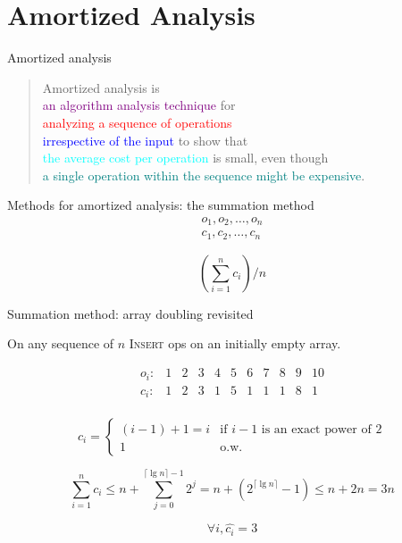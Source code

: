 \section{Amortized Analysis}

\begin{frame}{Amortized analysis}
  \begin{quote}
	Amortized analysis is \\
	\textcolor{purple}{an algorithm analysis technique} for \\ 
    \textcolor{red}{analyzing a sequence of operations} \\
	\textcolor{blue}{irrespective of the input} to show that \\
    \textcolor{cyan}{the average cost per operation} is small, even though \\ 
    \textcolor{teal}{a single operation within the sequence might be expensive}.
  \end{quote}
\end{frame}
\begin{frame}{Methods for amortized analysis: the summation method}
  \begin{gather*}
	o_1, o_2, \ldots, o_n \\[5pt]
	c_1, c_2, \ldots, c_n
  \end{gather*}

  \pause
  \[
	(\sum_{i = 1}^{n} c_i) / n
  \]
\end{frame}
\begin{frame}{Summation method: array doubling revisited}
  \centerline{On any sequence of $n$ \textsc{Insert} ops on an initially empty array.}

  \pause
  \[
    \begin{array}{ccccccccccc}
      o_i: 	& 1 & 2 & 3 & 4 & 5 & 6 & 7 & 8 & 9 & 10 \\
      c_i:  & 1 & 2 & 3 & 1 & 5 & 1 & 1 & 1 & 8 & 1  \\
    \end{array}
  \]

  \pause
  \begin{displaymath}
	c_i = \left\{ \begin{array}{ll}
	  (i-1)+1 = i & \textrm{if $i - 1$ is an exact power of 2}\\
	  1 & \textrm{o.w.}
	\end{array} \right.
  \end{displaymath}

  \pause
  \[
	\sum_{i=1}^{n} c_i \le n + \sum_{j=0}^{\lceil \lg n \rceil - 1} 2^{j} = n +
	(2^{\lceil \lg n \rceil} - 1) \le n + 2n = 3n
  \]

  \pause
  \[
	\forall i, \hat{c_i} = 3
  \]
\end{frame}
